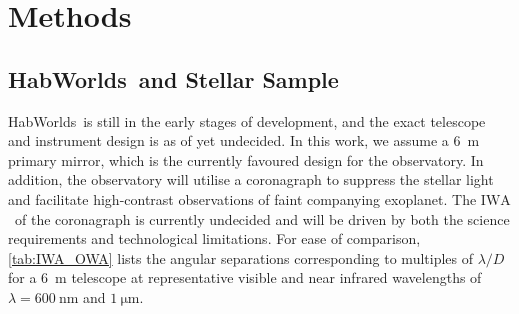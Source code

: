 \documentclass[
    usenatbib,
]{mnras}
\newcommand{\IWA}{\ensuremath{\mathrm{IWA}}}
\newcommand{\hwo}{HabWorlds}
\begin{document}
\section{Methods}


\subsection{\hwo\ and Stellar Sample}
\hwo\ is still in the early stages of development, and the exact 
telescope and instrument design is as of yet undecided. 
In this work, we assume a \SI{6}{\meter} primary mirror, which is the 
currently favoured design for the observatory.
In addition, the observatory will utilise a coronagraph to suppress the 
stellar light and facilitate high-contrast observations of faint 
companying exoplanet. 
The \IWA\ of the coronagraph is currently undecided and will be driven 
by both the science requirements and technological limitations. 
For ease of comparison, \cref{tab:IWA_OWA} lists the angular separations
corresponding to multiples of $\lambda / D$ for a \SI{6}{\meter} telescope at representative visible and near infrared wavelengths of $\lambda = \SI{600}{\nano\meter}$ and $\SI{1}{\micro\meter}$.
 
\end{document}
